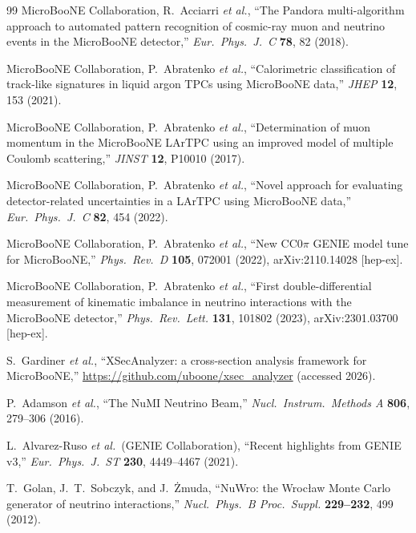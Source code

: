 \begin{thebibliography}{99}
  MicroBooNE Collaboration, R.~Acciarri \textit{et al.},
  ``The Pandora multi-algorithm approach to automated pattern recognition of
  cosmic-ray muon and neutrino events in the MicroBooNE detector,''
  \textit{Eur.\ Phys.\ J.\ C} \textbf{78}, 82 (2018).

  MicroBooNE Collaboration, P.~Abratenko \textit{et al.},
  ``Calorimetric classification of track-like signatures in liquid argon TPCs
  using MicroBooNE data,''
  \textit{JHEP} \textbf{12}, 153 (2021).

  MicroBooNE Collaboration, P.~Abratenko \textit{et al.},
  ``Determination of muon momentum in the MicroBooNE LArTPC using an improved
  model of multiple Coulomb scattering,''
  \textit{JINST} \textbf{12}, P10010 (2017).

  MicroBooNE Collaboration, P.~Abratenko \textit{et al.},
  ``Novel approach for evaluating detector-related uncertainties in a LArTPC
  using MicroBooNE data,''
  \textit{Eur.\ Phys.\ J.\ C} \textbf{82}, 454 (2022).

  MicroBooNE Collaboration, P.~Abratenko \textit{et al.},
  ``New CC0$\pi$ GENIE model tune for MicroBooNE,''
  \textit{Phys.\ Rev.\ D} \textbf{105}, 072001 (2022), arXiv:2110.14028 [hep-ex].

  MicroBooNE Collaboration, P.~Abratenko \textit{et al.},
  ``First double-differential measurement of kinematic imbalance in neutrino
  interactions with the MicroBooNE detector,''
  \textit{Phys.\ Rev.\ Lett.} \textbf{131}, 101802 (2023), arXiv:2301.03700 [hep-ex].

  S.~Gardiner \textit{et al.},
  ``XSecAnalyzer: a cross-section analysis framework for MicroBooNE,''
  \url{https://github.com/uboone/xsec_analyzer} (accessed 2026).

  P.~Adamson \textit{et al.},
  ``The NuMI Neutrino Beam,''
  \textit{Nucl.\ Instrum.\ Methods A} \textbf{806}, 279--306 (2016).

  L.~Alvarez-Ruso \textit{et al.}\ (GENIE Collaboration),
  ``Recent highlights from GENIE v3,''
  \textit{Eur.\ Phys.\ J.\ ST} \textbf{230}, 4449--4467 (2021).

  T.~Golan, J.~T.~Sobczyk, and J.~\.Zmuda,
  ``NuWro: the Wroc\l{}aw Monte Carlo generator of neutrino interactions,''
  \textit{Nucl.\ Phys.\ B Proc.\ Suppl.} \textbf{229--232}, 499 (2012).


\end{thebibliography}
